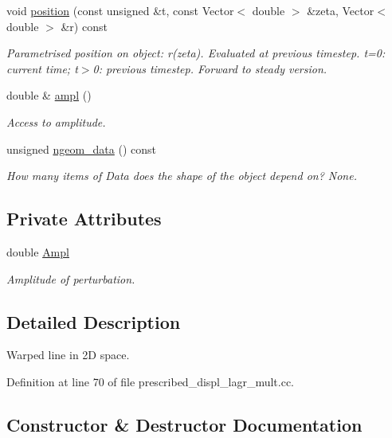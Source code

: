 \begin{DoxyCompactItemize}
void \hyperlink{classWarpedLine_a415d50f6bb49bd903015b51c66e93cd2}{position} (const unsigned \&t, const Vector$<$ double $>$ \&zeta, Vector$<$ double $>$ \&r) const
\begin{DoxyCompactList}\small\item\em Parametrised position on object\+: r(zeta). Evaluated at previous timestep. t=0\+: current time; t$>$0\+: previous timestep. Forward to steady version. \end{DoxyCompactList}\item 
double \& \hyperlink{classWarpedLine_ae43c2f997b9c0de62783375341ac5794}{ampl} ()
\begin{DoxyCompactList}\small\item\em Access to amplitude. \end{DoxyCompactList}\item 
unsigned \hyperlink{classWarpedLine_aa4157cd4ff2e80f33b106b7ed4e4d804}{ngeom\+\_\+data} () const
\begin{DoxyCompactList}\small\item\em How many items of Data does the shape of the object depend on? None. \end{DoxyCompactList}\end{DoxyCompactItemize}
\subsection*{Private Attributes}
\begin{DoxyCompactItemize}
\item 
double \hyperlink{classWarpedLine_ac44286e84ff213e67e0f247d00ad50af}{Ampl}
\begin{DoxyCompactList}\small\item\em Amplitude of perturbation. \end{DoxyCompactList}\end{DoxyCompactItemize}


\subsection{Detailed Description}
Warped line in 2D space. 

Definition at line 70 of file prescribed\+\_\+displ\+\_\+lagr\+\_\+mult.\+cc.



\subsection{Constructor \& Destructor Documentation}
\mbox{\label{classWarpedLine_a9d80dca2c907b426f7130579c94f3310}} 
